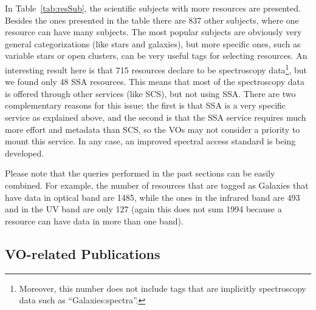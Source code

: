 In Table~\ref{tab:resSub}, the scientific subjects with more resources are presented. Besides the ones
presented in the table there are 837 other subjects, where one resource can have many subjects. 
The most popular subjects are obviously very general categorizations (like stars and galaxies), but
more specific ones, such as variable stars or open clusters, can be very useful tags for selecting
resources. An interesting result here is that 715 resources declare to be spectroscopy data\footnote{Moreover, this number does not include tags that are implicitly spectroscopy data such as ``Galaxies:spectra''.}, but we
found only 48 SSA resources. This means that most of the spectroscopy data is offered through other
services (like SCS), but not using SSA. There are two complementary reasons for this issue: the first
is that SSA is a very specific service as explained above, and the second is that the SSA service requires
much more effort and metadata than SCS, so the VOs may not consider a priority to mount this service.
In any case, an improved spectral access standard is being developed.

Please note that the queries performed in the past sections can be easily combined. For example,
the number of resources that are tagged as Galaxies that have data in optical band are 1485, while the ones in
the infrared band are 493 and in the UV band are only 127 (again this does not sum 1994 because a resource can have data
in more than one band). 

\subsection{VO-related Publications}



